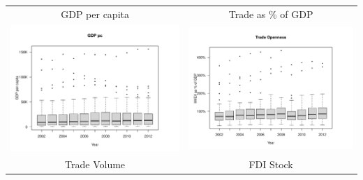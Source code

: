 \documentclass[reqno,onecolumn,letterpaper,12pt]{article}
\begin{document}
\begin{longtable}{c@{\hskip -.4cm}c}
GDP per capita &
Trade as \% of GDP\\
\includegraphics[height=.2\textheight, clip=true, trim=1cm 1cm 0cm 1.6cm]{draft_figures/descriptive_plots/GDPpc.pdf}    &
\includegraphics[height=.2\textheight, clip=true, trim=.95cm 1cm 0cm 1.6cm]{draft_figures/descriptive_plots/TradeO.pdf}   \\
Trade Volume &
FDI Stock\\

\end{longtable}
\end{document}
